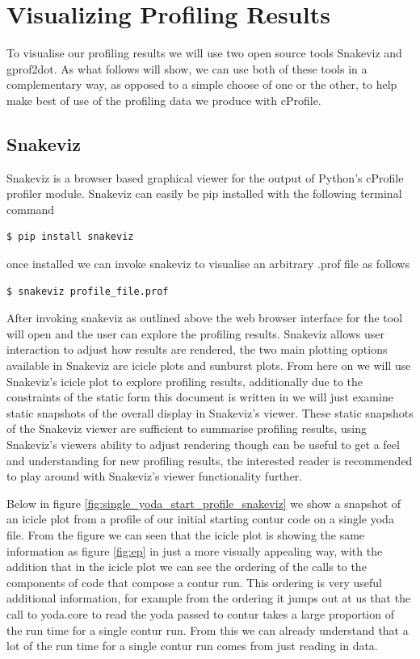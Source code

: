 \section{Visualizing Profiling Results}

To visualise our profiling results we will use two open source tools Snakeviz and gprof2dot. As what follows will show, we can use both of these tools in a complementary way, as opposed to a simple choose of one or the other, to help make best of use of the profiling data we produce with cProfile.

\subsection{Snakeviz}
Snakeviz is a browser based graphical viewer for the output of Python's cProfile profiler module. Snakeviz can easily be pip installed with the following terminal command

\begin{lstlisting}[language=bash]
  $ pip install snakeviz
\end{lstlisting}

once installed we can invoke snakeviz to visualise an arbitrary .prof file as follows

\begin{lstlisting}[language=bash]
  $ snakeviz profile_file.prof
\end{lstlisting}

After invoking snakeviz as outlined above the web browser interface for the tool will open and the user can explore the profiling results. Snakeviz allows user interaction to adjust how results are rendered, the two main plotting options available in Snakeviz are icicle plots and sunburst plots. From here on we will use Snakeviz's icicle plot to explore profiling results, additionally due to the constraints of the static form this document is written in we will just examine static snapshots of the overall display in Snakeviz's viewer. These static snapshots of the Snakeviz viewer are sufficient to summarise profiling results, using Snakeviz's viewers ability to adjust rendering though can be useful to get a feel and understanding for new profiling results, the interested reader is recommended to play around with Snakeviz's viewer functionality further.

Below in figure \ref{fig:single_yoda_start_profile_snakeviz} we show a snapshot of an icicle plot from a profile of our initial starting contur code on a single yoda file. From the figure we can seen that the icicle plot is showing the same information as figure \ref{fig:ep} in just a more visually appealing way, with the addition that in the icicle plot we can see the ordering of the calls to the components of code that compose a contur run. This ordering is very useful additional information, for example from the ordering it jumps out at us that the call to yoda.core to read the yoda passed to contur takes a large proportion of the run time for a single contur run. From this we can already understand that a lot of the run time for a single contur run comes from just reading in data. 

